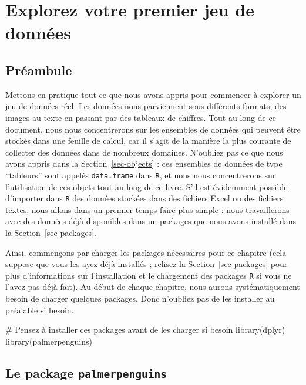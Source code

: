 \documentclass[
  a4paper,
  DIV=11,
  numbers=noendperiod,
  oneside]{scrreprt}
\newenvironment{Shaded}{}{}
\newcommand{\CommentTok}[1]{\textcolor[rgb]{0.42,0.45,0.49}{#1}}
\newcommand{\FunctionTok}[1]{\textcolor[rgb]{0.44,0.26,0.76}{#1}}
\newcommand{\NormalTok}[1]{\textcolor[rgb]{0.14,0.16,0.18}{#1}}
\begin{document}

\chapter{Explorez votre premier jeu de données}\label{sec-dataset}

\section{Préambule}\label{pruxe9ambule-1}

Mettons en pratique tout ce que nous avons appris pour commencer à
explorer un jeu de données réel. Les données nous parviennent sous
différents formats, des images au texte en passant par des tableaux de
chiffres. Tout au long de ce document, nous nous concentrerons sur les
ensembles de données qui peuvent être stockés dans une feuille de
calcul, car il s'agit de la manière la plus courante de collecter des
données dans de nombreux domaines. N'oubliez pas ce que nous avons
appris dans la Section~\ref{sec-objects} : ces ensembles de données de
type ``tableurs'' sont appelés \texttt{data.frame} dans \texttt{R}, et
nous nous concentrerons sur l'utilisation de ces objets tout au long de
ce livre. S'il est évidemment possible d'importer dans \texttt{R} des
données stockées dans des fichiers Excel ou des fichiers textes, nous
allons dans un premier temps faire plus simple : nous travaillerons avec
des données déjà disponibles dans un packages que nous avons installé
dans la Section~\ref{sec-packages}.

Ainsi, commençons par charger les packages nécessaires pour ce chapitre
(cela suppose que vous les ayez déjà installés ; relisez la
Section~\ref{sec-packages} pour plus d'informations sur l'installation
et le chargement des packages \texttt{R} si vous ne l'avez pas déjà
fait). Au début de chaque chapitre, nous aurons systématiquement besoin
de charger quelques packages. Donc n'oubliez pas de les installer au
préalable si besoin.

\begin{Shaded}
\begin{Highlighting}[]
\CommentTok{\# Pensez à installer ces packages avant de les charger si besoin}
\FunctionTok{library}\NormalTok{(dplyr)}
\FunctionTok{library}\NormalTok{(palmerpenguins)}
\end{Highlighting}
\end{Shaded}

\section{\texorpdfstring{Le package
\texttt{palmerpenguins}}{Le package palmerpenguins}}\label{le-package-palmerpenguins}
\end{document}
